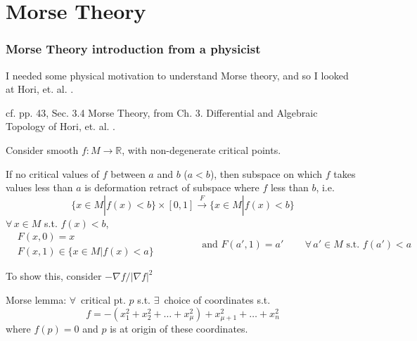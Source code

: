 \part{Morse Theory}


\section{Morse Theory introduction from a physicist}

I needed some physical motivation to understand Morse theory, and so I looked at Hori, et. al. \cite{dgdt:Hori2003}.  

cf. pp. 43, Sec. 3.4 Morse Theory, from Ch. 3. Differential and Algebraic Topology of Hori, et. al. \cite{dgdt:Hori2003}.

Consider smooth $f:M \to \mathbb{R}$, with non-degenerate critical points.

If no critical values of $f$ between $a$ and $b$ ($a<b$), then subspace on which $f$ takes values less than $a$ is deformation retract of subspace where $f$ less than $b$, i.e.
\[
\lbrace x \in M | f(x) < b\rbrace \times [0,1] \xrightarrow{ F } \lbrace x \in M | f(x) < b\rbrace
\]
$\forall \, x \in M$ s.t. $f(x) < b$,
\[
\begin{aligned}
  & F(x,0)  = x \\
  & F(x,1) \in \lbrace x \in M | f(x) < a \rbrace 
  \end{aligned} \qquad \qquad \, \text{ and } F(a',1) = a' \qquad \, \forall \, a' \in M \text{ s.t. } f(a') < a
\]

To show this, consider $-\nabla f/|\nabla f|^2$

Morse lemma: $\forall \, $ critical pt. $p$ s.t. $\exists \, $ choice of coordinates s.t.
\begin{equation}
  f  = - (x_1^2 + x_2^2 + \dots + x_{\mu}^2) + x_{\mu + 1}^2 + \dots + x_n^2
\end{equation}
where $f(p)=0$ and $p$ is at origin of these coordinates.

